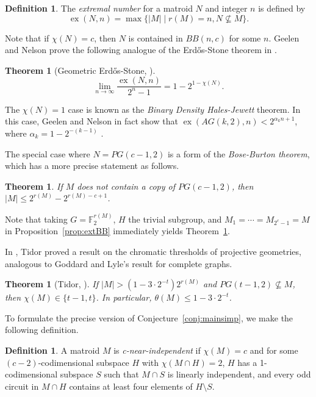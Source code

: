 \documentclass{article}
\theoremstyle{plain}
\newtheorem{thm}[theorem]{Theorem}
\theoremstyle{definition}
\theoremstyle{definition}
\newtheorem{defn}[theorem]{Definition}
\theoremstyle{remark}
\numberwithin{equation}{section}
\newcommand{\FF}{\mathbb{F}}
\DeclareMathOperator{\ex}{ex}
\begin{document}
\begin{defn}
The \emph{extremal number} for a matroid $N$ and integer $n$ is defined by
$$\ex(N,n)=\max\{|M| \mid r(M)=n, N\not\subseteq M\}.$$
\end{defn}

Note that if $\chi(N)=c$, then $N$ is contained in $BB(n,c)$ for some $n$. Geelen and Nelson prove the following analogue of the Erd\H{o}s-Stone theorem in \cite{gES}.

\begin{thm}[Geometric Erd\H{o}s-Stone, {\cite[Thm~1.3]{gES}}]
\label{thm:gES}
\[\lim_{n\rightarrow \infty} \frac{\ex(N,n)}{2^n-1}=1-2^{1-\chi(N)}.\]
\end{thm}

The $\chi(N)=1$ case is known as the \emph{Binary Density Hales-Jewett} theorem. In this case, Geelen and Nelson in fact show that $\ex(AG(k,2),n)<2^{\alpha_k n + 1}$, where $\alpha_k=1-2^{-(k-1)}$ \cite{gDHJ}.

The special case where $N=PG(c-1,2)$ is a form of the \emph{Bose-Burton theorem}, which has a more precise statement as follows.

\begin{thm}
\label{thm:BB}
If $M$ does not contain a copy of $PG(c-1,2)$, then $|M|\leq 2^{r(M)}-2^{r(M)-c+1}$.
\end{thm}

Note that taking $G=\FF_2^{r(M)}$, $H$ the trivial subgroup, and $M_1=\cdots=M_{2^c-1}=M$ in Proposition~\ref{prop:extBB} immediately yields Theorem~\ref{thm:BB}.

In \cite{tidor}, Tidor proved a result on the chromatic thresholds of projective geometries, analogous to Goddard and Lyle's result for complete graphs.

\begin{thm}[Tidor, {\cite[Thm~1.4]{tidor}}]
\label{thm:tidor}
If $|M|>(1-3\cdot 2^{-t})2^{r(M)}$ and $PG(t-1,2)\not\subseteq M$, then $\chi(M)\in \{t-1,t\}$. In particular, $\theta(M)\leq 1-3\cdot 2^{-t}$.
\end{thm}

To formulate the precise version of Conjecture~\ref{conj:mainsimp}, we make the following definition.

\begin{defn}
A matroid $M$ is \emph{c-near-independent} if $\chi(M)=c$ and for some $(c-2)$-codimensional subspace $H$ with $\chi(M\cap H)=2$, $H$ has a 1-codimensional subspace $S$ such that $M\cap S$ is linearly independent, and every odd circuit in $M\cap H$ contains at least four elements of $H\setminus S$.
\end{defn}
\end{document}
